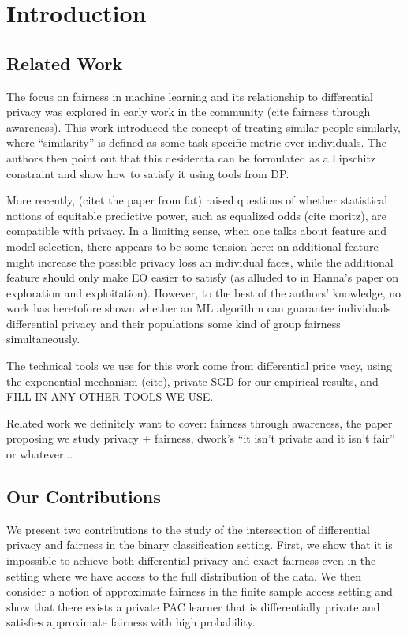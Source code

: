 \section{Introduction}

\subsection{Related Work}

The focus on fairness in machine learning and its relationship to
differential privacy was explored in early work in the community (cite
fairness through awareness). This work introduced the concept of
treating similar people similarly, where “similarity” is defined as
some task-specific metric over individuals.  The authors then point
out that this desiderata can be formulated as a Lipschitz constraint
and show how to satisfy it using tools from DP.

More recently, (citet the paper from fat) raised questions of whether
statistical notions of equitable predictive power, such as equalized
odds (cite moritz), are compatible with privacy. In a limiting sense,
when one talks about feature and model selection, there appears to be
some tension here: an additional feature might increase the possible
privacy loss an individual faces, while the additional feature should
only make EO easier to satisfy (as alluded to in Hanna’s paper on
exploration and exploitation). However, to the best of the authors’
knowledge, no work has heretofore shown whether an ML algorithm can
guarantee individuals differential privacy and their populations some
kind of group fairness simultaneously.

The technical tools we use for this work come from differential price
vacy, using the exponential mechanism (cite), private SGD for our
empirical results, and FILL IN ANY OTHER TOOLS WE USE.



Related work we definitely want to cover: fairness through awareness,
the paper proposing we study privacy + fairness, dwork's ``it isn't
private and it isn't fair'' or whatever...

\subsection{Our Contributions}
We present two contributions to the study of the intersection of
differential privacy and fairness in the binary classification setting.
First, we show that it is impossible to achieve both differential
privacy and exact fairness even in the setting where we have access to
the full distribution of the data. We then consider a notion of
approximate fairness in the finite sample access setting and show that
there exists a private PAC learner that is differentially private and
satisfies approximate fairness with high probability. 


